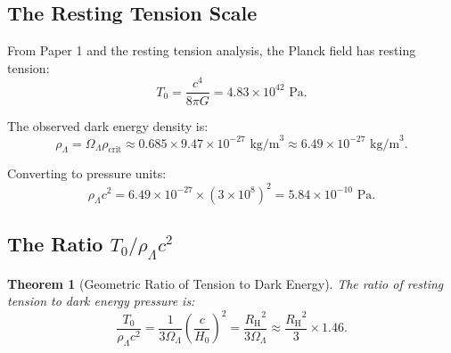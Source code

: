 \documentclass[11pt,a4paper]{article}
\newcommand{\rhocrit}{\ensuremath{\rho_{\mathrm{crit}}}}
\newcommand{\Tzero}{\ensuremath{T_0}}
\newcommand{\RH}{\ensuremath{R_{\mathrm{H}}}}
\newcommand{\OmegaLam}{\ensuremath{\Omega_\Lambda}}
\newtheorem{theorem}{Theorem}[section]
\theoremstyle{definition}
\theoremstyle{remark}
\begin{document}
\subsection{The Resting Tension Scale}
\label{sec:tension_scale}

From Paper 1 and the resting tension analysis, the Planck field has resting tension:
\begin{equation}
\label{eq:T0_value}
\Tzero = \frac{c^4}{8\pi G} = 4.83 \times 10^{42} \text{ Pa}.
\end{equation}

The observed dark energy density is:
\begin{equation}
\label{eq:rho_Lambda_value}
\rho_\Lambda = \OmegaLam \rhocrit \approx 0.685 \times 9.47 \times 10^{-27} \text{ kg/m}^3 \approx 6.49 \times 10^{-27} \text{ kg/m}^3.
\end{equation}

Converting to pressure units:
\begin{equation}
\label{eq:P_Lambda_value}
\rho_\Lambda c^2 = 6.49 \times 10^{-27} \times (3 \times 10^8)^2 = 5.84 \times 10^{-10} \text{ Pa}.
\end{equation}

\subsection{The Ratio $\Tzero/\rho_\Lambda c^2$}
\label{sec:tension_ratio}

\begin{theorem}[Geometric Ratio of Tension to Dark Energy]
\label{thm:tension_ratio}
The ratio of resting tension to dark energy pressure is:
\begin{equation}
\label{eq:tension_ratio}
\boxed{\frac{\Tzero}{\rho_\Lambda c^2} = \frac{1}{3\OmegaLam}\left(\frac{c}{H_0}\right)^2 = \frac{\RH^2}{3\OmegaLam} \approx \frac{\RH^2}{3} \times 1.46.}
\end{equation}
\end{theorem}
\end{document}
